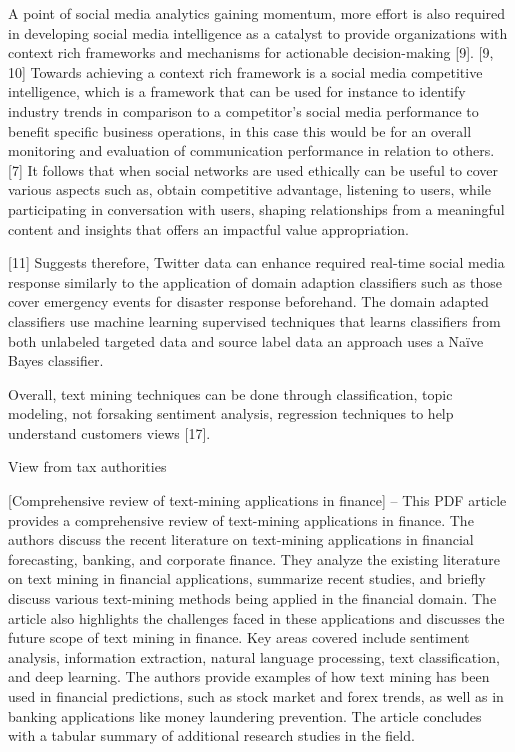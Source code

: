 A point of social media analytics gaining  momentum, more effort is also required in developing social media intelligence as a catalyst to provide organizations with context rich frameworks and mechanisms for actionable decision-making [9].   [9, 10] Towards achieving a context rich framework is a social media competitive intelligence, which is a framework that can be used for instance to identify industry trends in comparison to a competitor’s social media performance to benefit specific business operations, in this case this would be for an overall monitoring and evaluation of communication performance in relation to others.  [7] It follows that when social networks are used ethically can be useful to cover various aspects such as, obtain competitive advantage, listening  to users, while participating in conversation with users, shaping relationships from a meaningful content and insights that offers an impactful value appropriation.  

[11] Suggests therefore, Twitter data can enhance required real-time social media response similarly to the application of domain adaption classifiers such as those cover emergency events for disaster response beforehand.   The domain adapted classifiers use machine learning supervised techniques that learns classifiers from both unlabeled targeted data and source label data an  approach uses a Naïve Bayes classifier. 

Overall, text mining techniques can be done through classification, topic modeling, not forsaking sentiment analysis, regression techniques to help understand customers views [17]. 

View from tax authorities

[Comprehensive review of text-mining applications in finance]  -- This PDF article provides a comprehensive review of text-mining applications in finance. The authors discuss the recent literature on text-mining applications in financial forecasting, banking, and corporate finance. They analyze the existing literature on text mining in financial applications, summarize recent studies, and briefly discuss various text-mining methods being applied in the financial domain. The article also highlights the challenges faced in these applications and discusses the future scope of text mining in finance. Key areas covered include sentiment analysis, information extraction, natural language processing, text classification, and deep learning. The authors provide examples of how text mining has been used in financial predictions, such as stock market and forex trends, as well as in banking applications like money laundering prevention. The article concludes with a tabular summary of additional research studies in the field.

